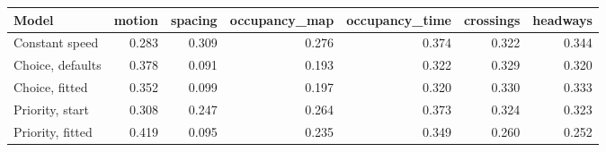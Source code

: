 \begin{tabular}{|l|r|r|r|r|r|r|}
\hline
\textbf{Model} & \textbf{motion} & \textbf{spacing} & \textbf{occupancy\_map} & \textbf{occupancy\_time} & \textbf{crossings} & \textbf{headways} \\
\hline
Constant speed & 0.283 & 0.309 & 0.276 & 0.374 & 0.322 & 0.344 \\
Choice, defaults & 0.378 & 0.091 & 0.193 & 0.322 & 0.329 & 0.320 \\
Choice, fitted & 0.352 & 0.099 & 0.197 & 0.320 & 0.330 & 0.333 \\
Priority, start & 0.308 & 0.247 & 0.264 & 0.373 & 0.324 & 0.323 \\
Priority, fitted & 0.419 & 0.095 & 0.235 & 0.349 & 0.260 & 0.252 \\
\hline
\end{tabular}

